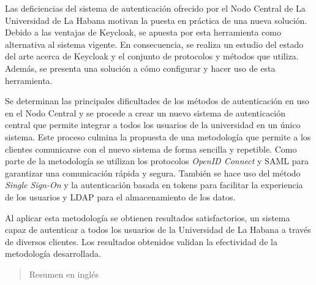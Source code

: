 \begin{resumen}
	Las deficiencias del sistema de autenticación ofrecido por el Nodo Central de La Universidad de La Habana motivan la puesta en práctica de una nueva solución. Debido a las ventajas de Keycloak, se apuesta por esta herramienta como alternativa al sistema vigente. En consecuencia, se realiza un estudio del estado del arte acerca de Keycloak y el conjunto de protocolos y métodos que utiliza. Además, se presenta una solución a cómo configurar y hacer uso de esta herramienta.
	
	Se determinan las principales dificultades de los métodos de autenticación en uso en el Nodo Central y se procede a crear un nuevo sistema de autenticación central que permite integrar a todos los usuarios de la universidad en un único sistema. Este proceso culmina la propuesta de una metodología que permite a los clientes comunicarse con el nuevo sistema de forma sencilla y repetible. Como parte de la metodología se utilizan los protocolos \textit{OpenID Connect} y SAML para garantizar una comunicación rápida y segura. También se hace uso del método \textit{Single Sign-On} y la autenticación basada en tokens para facilitar la experiencia de los usuarios y LDAP para el almacenamiento de los datos.
	
	Al aplicar esta metodología se obtienen resultados satisfactorios, un sistema capaz de autenticar a todos los usuarios de la Universidad de La Habana a través de diversos clientes. Los resultados obtenidos validan la efectividad de la metodología desarrollada.


\end{resumen}

\begin{abstract}
	Resumen en inglés
\end{abstract}